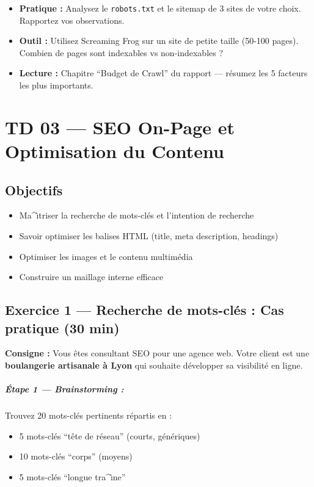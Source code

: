 \documentclass[12pt,a4paper]{report}
\begin{document}
\begin{itemize}
    \item \textbf{Pratique :} Analysez le \texttt{robots.txt} et le sitemap de 3 sites de votre choix. Rapportez vos observations.
    \item \textbf{Outil :} Utilisez Screaming Frog sur un site de petite taille (50-100 pages). Combien de pages sont indexables vs non-indexables ?
    \item \textbf{Lecture :} Chapitre ``Budget de Crawl'' du rapport --- r\'{e}sumez les 5 facteurs les plus importants.
\end{itemize}


\chapter{TD 03 --- SEO On-Page et Optimisation du Contenu}

\section{Objectifs}
\begin{itemize}
    \item Ma^{\^\i}triser la recherche de mots-cl\'{e}s et l'intention de recherche
    \item Savoir optimiser les balises HTML (title, meta description, headings)
    \item Optimiser les images et le contenu multim\'{e}dia
    \item Construire un maillage interne efficace
\end{itemize}

\section{Exercice 1 --- Recherche de mots-cl\'{e}s : Cas pratique (30 min)}

\textbf{Consigne :} Vous \^{e}tes consultant SEO pour une agence web. Votre client est une \textbf{boulangerie artisanale \`{a} Lyon} qui souhaite d\'{e}velopper sa visibilit\'{e} en ligne.

\paragraph{\'{E}tape 1 --- Brainstorming :} Trouvez 20 mots-cl\'{e}s pertinents r\'{e}partis en :
\begin{itemize}
    \item 5 mots-cl\'{e}s ``t\^{e}te de r\'{e}seau'' (courts, g\'{e}n\'{e}riques)
    \item 10 mots-cl\'{e}s ``corps'' (moyens)
    \item 5 mots-cl\'{e}s ``longue tra^{\^\i}ne''
\end{itemize}
\end{document}
